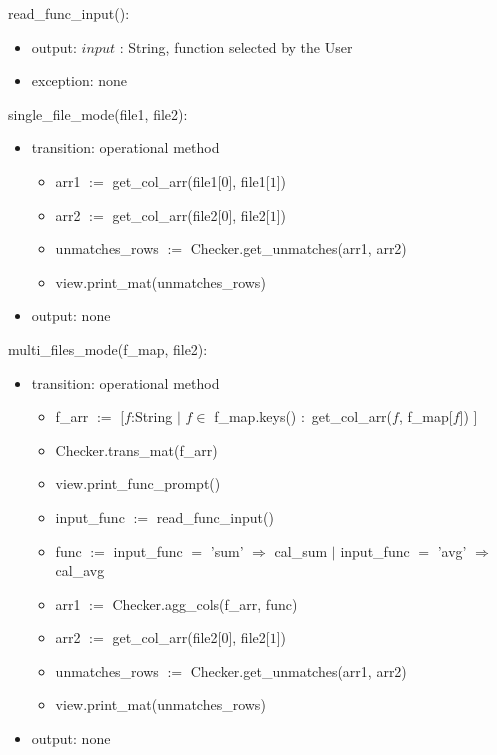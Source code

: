 \documentclass[12pt]{article}
\begin{document}
\noindent read\_func\_input():
\begin{itemize}
  \item output: $input$ : String, function selected by the User
  \item exception: none
\end{itemize}

\noindent single\_file\_mode(file1, file2):
\begin{itemize}
  \item transition: operational method 
  \begin{itemize}[\null]
    \item arr1 $:=$ get\_col\_arr(file1[$0$], file1[$1$])
    \item arr2 $:=$ get\_col\_arr(file2[$0$], file2[$1$])
    \item unmatches\_rows $:=$ Checker.get\_unmatches(arr1, arr2)
    \item view.print\_mat(unmatches\_rows)
  \end{itemize}
  \item output: none
\end{itemize}

\noindent multi\_files\_mode(f\_map, file2):
\begin{itemize}
  \item transition: operational method 
  \begin{itemize}[\null]
    \item f\_arr $:=$ [$f$:String $|$ $f \in$ f\_map.keys() $:$ get\_col\_arr($f$, f\_map[$f$]) ]
    \item Checker.trans\_mat(f\_arr)
    \item view.print\_func\_prompt()
    \item input\_func $:=$ read\_func\_input()
    \item func $:=$ input\_func $=$ 'sum' $\Rightarrow$ cal\_sum $|$  
    input\_func $=$ 'avg' $\Rightarrow$ cal\_avg
    \item arr1 $:=$ Checker.agg\_cols(f\_arr, func)
    \item arr2 $:=$ get\_col\_arr(file2[$0$], file2[$1$])
    \item unmatches\_rows $:=$ Checker.get\_unmatches(arr1, arr2)
    \item view.print\_mat(unmatches\_rows)
  \end{itemize}
  \item output: none
\end{itemize}
\end{document}
